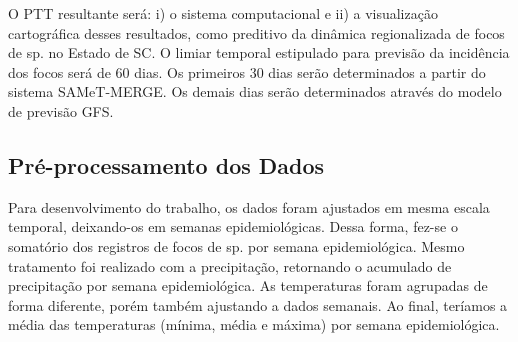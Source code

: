 \indent O \acrshort{PTT} resultante será: i) o sistema computacional e ii) a visualização cartográfica desses resultados, como preditivo da dinâmica regionalizada de focos de  sp. no Estado de \acrlong{SC}. O limiar temporal estipulado para previsão da incidência dos focos será de 60 dias. Os primeiros 30 dias serão determinados a partir do sistema \acrshort{SAMeT}-\acrshort{MERGE}. Os demais dias serão determinados através do modelo de previsão \acrshort{GFS}.








\subsection{Pré-processamento dos Dados}
\indent Para desenvolvimento do trabalho, os dados foram ajustados em mesma escala temporal, deixando-os em semanas epidemiológicas. Dessa forma, fez-se o somatório dos registros de focos de  sp. por semana epidemiológica. Mesmo tratamento foi realizado com a precipitação, retornando o acumulado de precipitação por semana epidemiológica. As temperaturas foram agrupadas de forma diferente, porém também ajustando a dados semanais. Ao final, teríamos a média das temperaturas (mínima, média e máxima) por semana epidemiológica.\\



